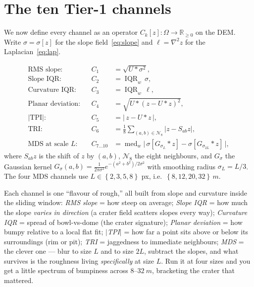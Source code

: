 \documentclass[11pt]{article}
\theoremstyle{definition}
\newcommand{\R}{\mathbb{R}}
\newcommand{\lap}{\nabla^2}
\newcommand{\abs}[1]{\left\lvert #1 \right\rvert}
\newcommand{\set}[1]{\left\{ #1 \right\}}
\newcommand{\med}{\operatorname{med}}
\newcommand{\IQR}{\operatorname{IQR}}
\newcommand{\conv}{\mathbin{\ast}}
\begin{document}
\section{The ten Tier-1 channels}

We now define every channel as an operator $C_k[z]:\Omega\to\R_{\ge0}$ on the DEM.
Write $\sigma=\sigma[z]$ for the slope field~\eqref{eq:slope} and $\ell=\lap z$ for
the Laplacian~\eqref{eq:lap}.

\begin{align}
\text{RMS slope:}&& C_1 &= \sqrt{U\conv \sigma^2}, \\
\text{Slope IQR:}&& C_2 &= \IQR_w\,\sigma, \\
\text{Curvature IQR:}&& C_3 &= \IQR_w\,\ell, \\
\text{Planar deviation:}&& C_4 &= \sqrt{U\conv(z-U\conv z)^2}, \\
\text{$\lvert$TPI$\rvert$:}&& C_5 &= \abs{\,z-U\conv z\,}, \\
\text{TRI:}&& C_6 &= \tfrac{1}{8}\!\!\sum_{(a,b)\in\mathcal{N}_8}\!\!\abs{z-S_{ab}z}, \\
\text{MDS at scale }L:&& C_{7\dots10} &= \med_w\Big|\,\sigma[G_{\sigma_L}\!\conv z]-\sigma[G_{\sigma_{2L}}\!\conv z]\,\Big|,
\end{align}
where $S_{ab}z$ is the shift of $z$ by $(a,b)$, $\mathcal{N}_8$ the eight neighbours,
and $G_{\sigma}$ the Gaussian kernel $G_\sigma(a,b)=\frac{1}{2\pi\sigma^2}
e^{-(a^2+b^2)/2\sigma^2}$ with smoothing radius $\sigma_L = L/3$. The four MDS
channels use $L\in\set{2,3,5,8}$ px, i.e.\ $\set{8,12,20,32}\,\si{m}$.

\begin{words}
Each channel is one ``flavour of rough,'' all built from slope and curvature inside
the sliding window:
\emph{RMS slope} = how steep on average; \emph{Slope IQR} = how much the slope
\emph{varies in direction} (a crater field scatters slopes every way); \emph{Curvature
IQR} = spread of bowl-vs-dome (the crater signature); \emph{Planar deviation} = how
bumpy relative to a local flat fit; \emph{$|$TPI$|$} = how far a point sits above or
below its surroundings (rim or pit); \emph{TRI} = jaggedness to immediate neighbours;
\emph{MDS} = the clever one --- blur to size $L$ and to size $2L$, subtract the
slopes, and what survives is the roughness living \emph{specifically} at size $L$.
Run it at four sizes and you get a little spectrum of bumpiness across
$8$--$\SI{32}{m}$, bracketing the crater that mattered.
\end{words}
\end{document}
